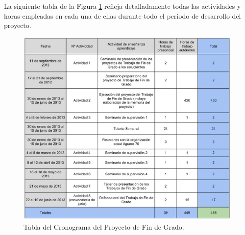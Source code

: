 La siguiente tabla de la Figura \ref{fig:periodo} refleja detalladamente todas las actividades y horas empleadas en cada una de ellas durante todo el 
período de desarrollo del proyecto.
\begin{figure}[H]
\begin{center}
\includegraphics[width=1.0\textwidth]{images/periodo.jpg}
\caption{Tabla del Cronograma del Proyecto de Fin de Grado.}
\label{fig:periodo}
\end{center}
\end{figure}

